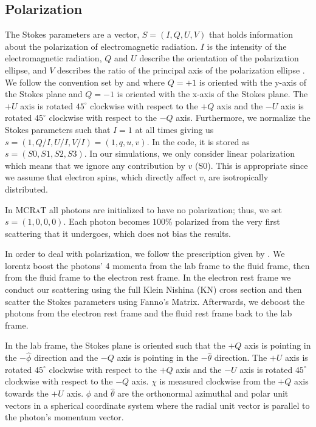 \documentclass[12pt,a4paper]{article}
\newcommand{\mcrat}{\textsc{MCRaT}}
\begin{document}
\subsection{Polarization}\label{pol}
The Stokes parameters are a vector, $S=(I, Q, U, V)$ that holds information about the polarization of electromagnetic radiation. $I$ is the intensity of the electromagnetic radiation, $Q$ and $U$ describe the orientation of the polarization ellipse, and $V$ describes the ratio of the principal axis of the polarization ellipse \citep{Rybiki_Lightman}. {We follow the convention set by \cite{McMaster:1961aa} and  \cite{lundman2014polarization}
where $Q=+1$ is oriented with the y-axis of the Stokes plane and $Q=-1$ is oriented with the x-axis of the Stokes plane. The $+U$ axis is rotated $45^\circ$ clockwise with respect to the $+Q$ axis and the  $-U$ axis is rotated $45^\circ$ clockwise with respect to the $-Q$ axis. }Furthermore, we normalize the Stokes parameters such that $I=1$ at all times giving us $s=(1, Q/I, U/I, V/I)=(1,q,u,v)$. In the code, it is stored as $s=(S0, S1, S2, S3)$. In our simulations, we only consider linear polarization which means that we ignore any contribution by $v$ (S0). This is appropriate since we assume that electron spins, which directly affect $v$, are isotropically distributed.

In \mcrat{} all photons are initialized to have no polarization; thus, we set $s=(1,0,0,0)$. Each photon becomes $100$\% polarized from the very first scattering that it undergoes, which does not bias the results. 

In order to deal with polarization, we follow the prescription given by \cite{lundman2014polarization}. We lorentz boost the photons' 4 momenta from the lab frame to the fluid frame, then from the fluid frame to the electron rest frame. In the electron rest frame we conduct our scattering using the full Klein Nishina (KN) cross section and then scatter the Stokes parameters using Fanno's Matrix. Afterwards, we deboost the photons from the electron rest frame and the fluid rest frame back to the lab frame. 

{In the lab frame, the Stokes plane is oriented such that the $+Q$ axis is pointing in the $-\hat{\phi}$ direction and the $-Q$ axis is pointing in the $-\hat{\theta}$ direction. The $+U$ axis is rotated $45^\circ$ clockwise with respect to the $+Q$ axis and the  $-U$ axis is rotated $45^\circ$ clockwise with respect to the $-Q$ axis. $\chi$ is measured clockwise from the $+Q$ axis towards the $+U$ axis. $\hat{\phi}$ and $\hat{\theta}$ are the orthonormal azimuthal and polar unit vectors in a spherical coordinate system where the radial unit vector is parallel to the photon's momentum vector.} 
\end{document}
